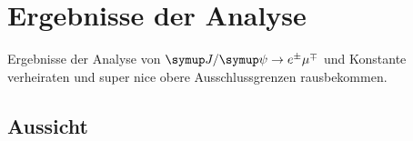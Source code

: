 \chapter{Ergebnisse der Analyse}
\label{chap:5}
%
Ergebnisse der Analyse von $\signal$ und Konstante verheiraten und super nice obere Ausschlussgrenzen rausbekommen.
%
\section{Aussicht}
